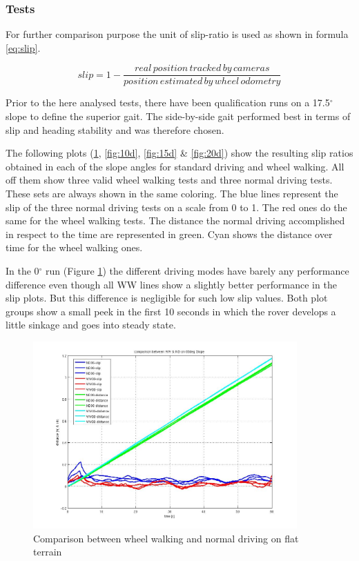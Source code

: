 \documentclass[a4paper,twocolumn]{esapub2005} %
\begin{document}
\subsubsection{Tests} For further comparison purpose the unit of slip-ratio is
used as shown in formula \ref{eq:slip}.

\begin{equation} slip = 1- \frac{real\, position\, tracked\, by\,
cameras}{position\, estimated\, by\, wheel\, odometry} \label{eq:slip}
\end{equation}

Prior to the here analysed tests, there have been qualification runs on a
17.5$^{\circ}$ slope to define the superior gait.  The side-by-side gait
performed best in terms of slip and heading stability and was therefore chosen. 


The following plots (\ref{fig:00d}, \ref{fig:10d}, \ref{fig:15d} \&
\ref{fig:20d}) show the resulting slip ratios obtained in each of the slope
angles for standard driving and wheel walking. All off them show three valid
wheel walking tests and three normal driving tests. These sets are always shown
in the same coloring. The blue lines represent the slip of the three normal
driving tests on a scale from 0 to 1. The red ones do the same for the wheel
walking tests. The distance the normal driving accomplished in respect to the
time are represented in green. Cyan shows the distance over time for the wheel
walking ones.

In the 0$^\circ$ run (Figure \ref{fig:00d}) the different driving modes have
barely any performance difference even though all WW lines show a slightly
better performance in the slip plots. But this difference is negligible for
such low slip values. Both plot groups show a small peek in the first 10
seconds in which the rover develops a little sinkage and goes into steady
state. 


\begin{figure}[h!]
    \centering
    \includegraphics[width=0.9\textwidth]{00d.jpg}
    \caption{Comparison between wheel walking and normal driving on flat terrain}
    \label{fig:00d}
\end{figure}
\end{document}

